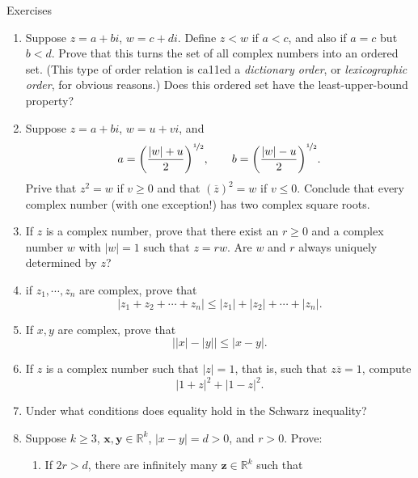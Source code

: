 \begin{xcb}{Exercises}
\begin{enumerate}
    \item  Suppose $z=a+bi$, $w=c+di$. Define $z<w$ if $a < c$, and also if $a = c$ but $b < d$. Prove that this turns the set of all 
    complex numbers into an ordered set. (This type of order relation is ca11ed a \emph{dictionary order}, or \emph{lexicographic order}, for 
    obvious reasons.) Does this ordered set have the least-upper-bound property?
    \item Suppose $z=a+bi$, $w=u+vi$, and 
    \begin{equation*}
      a = \biggl(\frac{\left|w\right|+u}{2}\biggr)^{\nicefrac{1}{2}}, \qquad b = \biggl(\frac{\left|w\right|-u}{2}\biggr)^{\nicefrac{1}{2}}.
    \end{equation*}
    Prive that $z^2=w$ if $v\geq 0$ and that $(\overline{z})^2=w$ if $v\leq 0$. Conclude that every complex number (with one exception!) has two
    complex square roots.
    \item If $z$ is a complex number, prove that there exist an $r \geq 0$ and a complex number $w$ with $\left| w \right| = 1$ such that $z=rw$.
    Are $w$ and $r$ always uniquely determined by $z$?
    \item if $z_1,\cdots,z_n$ are complex, prove that
    \begin{equation*}
      \left|z_1+z_2+\cdots+z_n\right|\leq \left|z_1\right|+\left|z_2\right|+\cdots+\left|z_n\right|.
    \end{equation*}
    \item If $x,y$ are complex, prove that 
    \begin{equation*}
      \left|\left|x\right|-\left|y\right|\right|\leq \left|x-y\right|.
    \end{equation*}
    \item If $z$ is a complex number such that $\left|z\right| = 1$, that is, such that $z\overline{z} =1$, compute
    \begin{equation*}
      \left|1+z\right|^2+\left|1-z\right|^2.
    \end{equation*}
    \item Under what conditions does equality hold in the Schwarz inequality?
    \item Suppose $k \geq 3$, $\boldsymbol{x},\boldsymbol{y} \in \mathbb{R}^k$, $\left|x-y\right|=d>0$, and $r>0$. Prove:
    \begin{enumerate}
      \item If $2r > d$, there are infinitely many $\boldsymbol{z} \in \mathbb{R}^k$ such that
      \begin{equation*}

\end{equation*}
\end{enumerate}
\end{enumerate}
\end{xcb}
